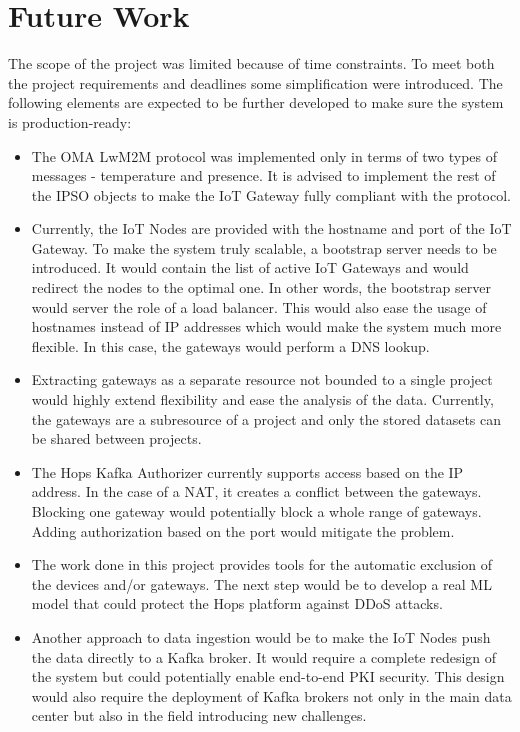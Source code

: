 \section{Future Work}
    The scope of the project was limited because of time constraints.
    To meet both the project requirements and deadlines some simplification were introduced. 
    The following elements are expected to be further developed to make sure the system is production-ready:
        \begin{itemize}
        \item The \ac{OMA LwM2M} protocol was implemented only in terms of two types of messages - temperature and presence. It is advised to implement the rest of the \ac{IPSO} objects to make the IoT Gateway fully compliant with the protocol.
        \item Currently, the IoT Nodes are provided with the hostname and port of the IoT Gateway. To make the system truly scalable, a bootstrap server needs to be introduced. It would contain the list of active IoT Gateways and would redirect the nodes to the optimal one. In other words, the bootstrap server would server the role of a load balancer. This would also ease the usage of hostnames instead of IP addresses which would make the system much more flexible. In this case, the gateways would perform a DNS lookup.
        \item Extracting gateways as a separate resource not bounded to a single project would highly extend flexibility and ease the analysis of the data. Currently, the gateways are a subresource of a project and only the stored datasets can be shared between projects.
        \item The Hops Kafka Authorizer currently supports access based on the IP address. In the case of a \ac{NAT}, it creates a conflict between the gateways. Blocking one gateway would potentially block a whole range of gateways. Adding authorization based on the port would mitigate the problem.
        \item The work done in this project provides tools for the automatic exclusion of the devices and/or gateways. The next step would be to develop a real \ac{ML} model that could protect the Hops platform against \ac{DDoS} attacks.
        \item Another approach to data ingestion would be to make the IoT Nodes push the data directly to a Kafka broker. It would require a complete redesign of the system but could potentially enable end-to-end \ac{PKI} security. This design would also require the deployment of Kafka brokers not only in the main data center but also in the field introducing new challenges.
    \end{itemize}
